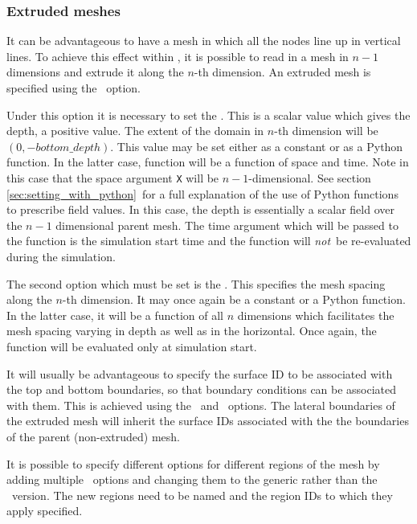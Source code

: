 \subsubsection{Extruded meshes}\label{sec:extruded}

It can be advantageous to have a mesh in which all the nodes line up in
vertical lines. To achieve this effect within \fluidity, it is possible to
read in a mesh in $n-1$ dimensions and extrude it along the $n$-th
dimension. An extruded mesh is specified using the
\ option.

Under this option it is necessary to set the . This is
a scalar value which gives the depth, a positive value. The extent of the
domain in $n$-th dimension will be $(0,-bottom\_depth)$. This value may be
set either as a constant or as a Python function. In the latter case,
function will be a function of space and time. Note in this case that the
space argument \lstinline[language=Python]+X+ will be $n-1$-dimensional. See
section \ref{sec:setting_with_python}\ for a full explanation of the use of Python functions to
prescribe field values. In this case, the depth is essentially a scalar
field over the $n-1$ dimensional parent mesh. The time argument which
will be passed to the function is the simulation start time and the function
will \emph{not}\ be re-evaluated during the simulation.

The second option which must be set is the
. This specifies the mesh spacing
along the $n$-th dimension. It may once again be a constant or a Python
function. In the latter case, it will be a function of all $n$ dimensions
which facilitates the mesh spacing varying in depth as well as in the
horizontal. Once again, the function will be evaluated only at simulation
start.

It will usually be advantageous to specify the surface ID to be associated
with the top and bottom boundaries, so that boundary conditions can be
associated with them. This is achieved using the
\ and
\ options. The lateral boundaries
of the extruded mesh will inherit the surface IDs associated with the the
boundaries of the parent (non-extruded) mesh.

It is possible to specify different options for different regions of the
mesh by adding multiple \ options and changing
them to the generic rather than the \
version. The new regions need to be named and the region IDs to which they
apply specified.

